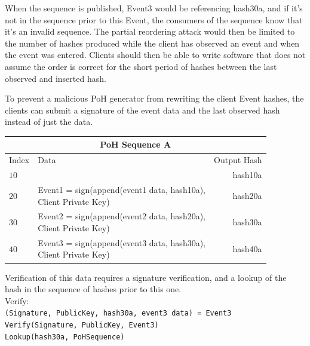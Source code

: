 \documentclass[12pt]{article}
\begin{document}
When the sequence is published, Event3 would be referencing hash30a, and if it’s not in the sequence prior to this Event, the consumers of the sequence know that it’s an invalid sequence. The partial reordering attack would then be limited to the number of hashes produced while the client has observed an event and when the event was entered. Clients should then be able to write software that does not assume the order is correct for the short period of hashes between the last observed and inserted hash.

To prevent a malicious PoH generator from rewriting the client Event hashes, the clients can submit a signature of the event data and the last observed hash instead of just the data.\\
\begin{center}
  \begin{tabular}{  l  l  r }
    \multicolumn{3}{c}{PoH Sequence A} \\
    \hline
    Index & Data & Output Hash \\ \hline
    $10$ & & hash10a  \\ 
    $20$ & \makecell{Event1 = sign(append(event1 data, hash10a), \\Client Private Key)} & hash20a\\ 
    $30$ & \makecell{Event2 = sign(append(event2 data, hash20a), \\Client Private Key)} & hash30a \\ 
    $40$ & \makecell{Event3 = sign(append(event3 data, hash30a), \\Client Private Key)} & hash40a \\

    \end{tabular}
\end{center}

Verification of this data requires a signature verification, and a lookup of the hash in the sequence of hashes prior to this one.\\
\noindent Verify:\\

\noindent\texttt{(Signature, PublicKey, hash30a, event3 data) = Event3} \\
\texttt{Verify(Signature, PublicKey, Event3)}\\
\texttt{Lookup(hash30a, PoHSequence)}\\
\end{document}
